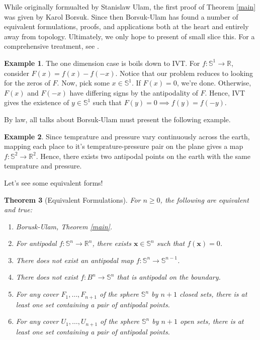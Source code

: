 \documentclass[12pt]{amsart}
\newtheorem{thm}{Theorem}[section]
\theoremstyle{definition}
\newtheorem{ex}[thm]{Example}
\begin{document}
    While originally formualted by Stanislaw Ulam, the first proof of Theorem \ref{main} was given by Karol Borsuk. Since then Borsuk-Ulam has found a number of equivalent formulations, proofs, and applications both at the heart and entirely away from topology. Ultimately, we only hope to present of small slice this. For a comprehensive treatment, see \cite{stein}.

    \begin{ex}
        The one dimension case is boils down to IVT. For $f: \mathbb S^1 \to \mathbb R$, consider $F(x) = f(x) - f(-x)$. Notice that our problem reduces to looking for the zeros of $F$. Now, pick some $x \in \mathbb S^1$. If $F(x) = 0$, we're done. Otherwise, $F(x)$ and $F(-x)$ have differing signs by the antipodality of $F$. Hence, IVT gives the existence of $y \in \mathbb S^1$ such that $F(y) = 0 \implies f(y) = f(-y)$. 
    \end{ex}

    By law, all talks about Borsuk-Ulam must present the following example.

    \begin{ex}
        Since temprature and pressure vary continuously across the earth, mapping each place to it's temprature-pressure pair on the plane gives a map $f: \mathbb S^2 \to \mathbb R^2$. Hence, there exists two antipodal points on the earth with the same temprature and pressure.
    \end{ex}

    Let's see some equivalent forms!

    \begin{thm}[Equivalent Formulations]
        \label{equiv}
        For $n \geq 0$, the following are equivalent and true:
        \begin{enumerate}
            \item Borusk-Ulam, Theorem \ref{main}.
            \item For antipodal $f: \mathbb S^n \to \mathbb R^n$, there exists $\mathbf x \in \mathbb S^n$ such that $f(\mathbf x) = 0$.
            \item There does not exist an antipodal map $f: \mathbb S^n \to \mathbb S^{n-1}$.
            \item There does not exist $f: B^n \to \mathbb S^n$ that is antipodal on the boundary.
            \item For any cover $F_1,\ldots,F_{n+1}$ of the sphere $\mathbb S^n$ by $n+1$ closed sets, there is at least one set containing a pair of antipodal points.
            \item For any cover $U_1,\ldots,U_{n+1}$ of the sphere $\mathbb S^n$ by $n+1$ open sets, there is at least one set containing a pair of antipodal points.
        \end{enumerate}
    \end{thm}
\end{document}
